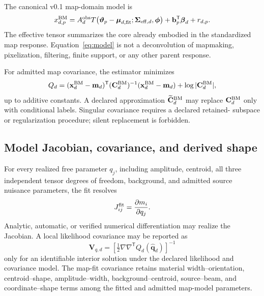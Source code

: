The canonical v0.1 map-domain model is
\begin{equation}
x^{\rm BM}_{d,p}=
A_d^{\rm obs}
T\!\left(\boldsymbol\vartheta_p-\boldsymbol\mu_{d,\rm fit};
\boldsymbol\Sigma_{{\rm eff},d},\boldsymbol\phi\right)
+\mathbf b_p^\mathsf T\boldsymbol\beta_d+r_{d,p} .
\label{eq:model}
\end{equation}
The effective tensor summarizes the core already embodied in the standardized
map response. Equation~\ref{eq:model} is not a deconvolution of mapmaking,
pixelization, filtering, finite support, or any other parent response.

For admitted map covariance, the estimator minimizes
\begin{equation}
Q_d=(\mathbf x_d^{\rm BM}-\mathbf m_d)^\mathsf T
(\mathbf C_d^{\rm BM})^{-1}(\mathbf x_d^{\rm BM}-\mathbf m_d)
+\log|\mathbf C_d^{\rm BM}|,
\label{eq:objective}
\end{equation}
up to additive constants. A declared approximation
$\widetilde{\mathbf C}_d^{\rm BM}$ may replace $\mathbf C_d^{\rm BM}$ only
with conditional labels. Singular covariance requires a declared retained-
subspace or regularization procedure; silent replacement is forbidden.

\subsection{Model Jacobian, covariance, and derived shape}

For every realized free parameter $q_j$, including amplitude, centroid, all
three independent tensor degrees of freedom, background, and admitted source
nuisance parameters, the fit resolves
\begin{equation}
J^{\rm fit}_{ij}=\frac{\partial m_i}{\partial q_j}.
\label{eq:model-jacobian}
\end{equation}
Analytic, automatic, or verified numerical differentiation may realize the
Jacobian. A local likelihood covariance may be reported as
\begin{equation}
\mathbf V_{q,d}=\left[
\tfrac12\nabla\nabla^\mathsf TQ_d(\widehat{\mathbf q}_d)
\right]^{-1}
\label{eq:fitcov}
\end{equation}
only for an identifiable interior solution under the declared likelihood and
covariance model. The map-fit covariance retains material
width--orientation, centroid--shape, amplitude--width,
background--centroid, source--beam, and coordinate--shape terms among the
fitted and admitted map-model parameters.

